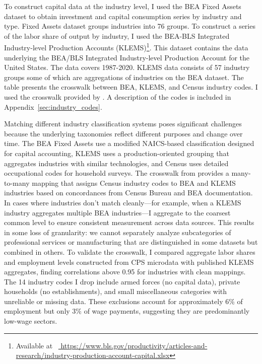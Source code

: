 \documentclass[12pt]{article}
\begin{document}
To construct capital data at the industry level, I used the BEA Fixed Assets dataset to obtain investment and capital consumption series by industry and type. Fixed Assets dataset groups industries into 76 groups. To construct a series of the labor share of output by industry, I used the BEA-BLS Integrated Industry-level Production Accounts (KLEMS)\footnote{Available at \ \url{ https://www.bls.gov/productivity/articles-and-research/industry-production-account-capital.xlsx}}. This dataset contains the data underlying the BEA/BLS Integrated Industry-level Production Account for the United States. The data covers 1987-2020. KLEMS data consists of 57 industry groups some of which are aggregations of industries on the BEA dataset. The table presents the crosswalk between BEA, KLEMS, and Census industry codes. I used the crosswalk provided by \citep{acemoglu2020unpacking}. A description of the codes is included in Appendix~\ref{sec:industry_codes}.

Matching different industry classification systems poses significant challenges because the underlying taxonomies reflect different purposes and change over time. The BEA Fixed Assets use a modified NAICS-based classification designed for capital accounting, KLEMS uses a production-oriented grouping that aggregates industries with similar technologies, and Census uses detailed occupational codes for household surveys. The crosswalk from \citet{acemoglu2020unpacking} provides a many-to-many mapping that assigns Census industry codes to BEA and KLEMS industries based on concordances from Census Bureau and BEA documentation. In cases where industries don't match cleanly---for example, when a KLEMS industry aggregates multiple BEA industries---I aggregate to the coarsest common level to ensure consistent measurement across data sources. This results in some loss of granularity: we cannot separately analyze subcategories of professional services or manufacturing that are distinguished in some datasets but combined in others. To validate the crosswalk, I compared aggregate labor shares and employment levels constructed from CPS microdata with published KLEMS aggregates, finding correlations above 0.95 for industries with clean mappings. The 14 industry codes I drop include armed forces (no capital data), private households (no establishments), and small miscellaneous categories with unreliable or missing data. These exclusions account for approximately 6\% of employment but only 3\% of wage payments, suggesting they are predominantly low-wage sectors.
\end{document}
